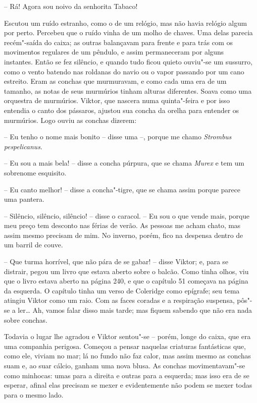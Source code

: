 -- Rá! Agora sou noivo da senhorita Tabaco! 

Escutou um ruído estranho, como o de um relógio, mas não havia relógio
algum por perto.  Percebeu que o ruído vinha de um molho de chaves. Uma
delas parecia recém"-saída do caixa; as outras balançavam para frente
e para trás com os movimentos regulares de um pêndulo, e assim
permaneceram por alguns instantes. Então se fez silêncio, e quando tudo
ficou quieto ouviu"-se um sussurro, como o vento batendo nas roldanas
do navio ou o vapor passando por um cano estreito. Eram as conchas que
murmuravam, e como cada uma era de um tamanho, as notas de seus
murmúrios tinham alturas diferentes. Soava como uma orquestra de
murmúrios. Viktor, que nascera numa quinta"-feira e por isso entendia
o canto dos pássaros, ajustou sua concha da orelha para entender os
murmúrios. Logo ouviu as conchas dizerem:

-- Eu tenho o nome mais bonito -- disse uma --, porque me chamo
\textit{Strombus pespelicanus}.

-- Eu sou a mais bela! -- disse a concha púrpura, que se chama
\textit{Murex} e tem um sobrenome esquisito.

-- Eu canto melhor! -- disse a concha"-tigre, que se chama assim porque
parece uma pantera.

-- Silêncio, silêncio, silêncio! -- disse o caracol. -- Eu sou o que vende
mais, porque meu preço tem desconto nas férias de verão. As pessoas me
acham chato, mas assim mesmo precisam de mim. No inverno, porém, fico
na despensa dentro de um barril de couve.

-- Que turma horrível, que não pára de se gabar! -- disse Viktor; e, para
se distrair, pegou um livro que estava aberto sobre o balcão. Como
tinha olhos, viu que o livro estava aberto na página 240, e que o
capítulo 51 começava na página da esquerda. O capítulo tinha um verso
de Coleridge como epígrafe; seu tema atingiu Viktor como um raio. Com
as faces coradas e a respiração suspensa, pôs"-se a ler\ldots{} Ah, vamos
falar disso mais tarde; mas fiquem sabendo que não era nada sobre
conchas.

Todavia o lugar lhe agradou e Viktor sentou"-se -- porém, longe do
caixa, que era uma companhia perigosa. Começou a pensar naquelas
criaturas fantásticas que, como ele, viviam no mar; lá no fundo não faz
calor, mas assim mesmo as conchas suam e, ao suar cálcio, ganham uma
nova blusa. As conchas movimentavam"-se como minhocas: umas para a
direita e outras para a esquerda; mas isso era de se esperar, afinal
elas precisam se mexer e evidentemente não podem se mexer todas para o
mesmo lado.

